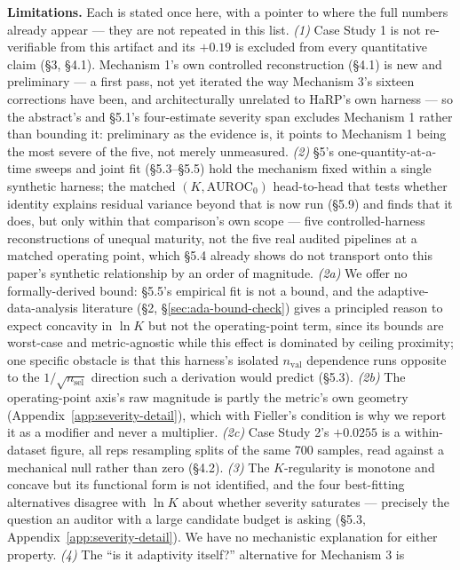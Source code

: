 \documentclass[10pt]{article} %
\begin{document}
\textbf{Limitations.} Each is stated once here, with a pointer to where the
full numbers already appear --- they are not repeated in this list.
\emph{(1)} Case Study 1 is not re-verifiable from this artifact and its
$+0.19$ is excluded from every quantitative claim (§3, §4.1). Mechanism 1's
own controlled reconstruction (§4.1) is new and preliminary --- a first pass,
not yet iterated the way Mechanism 3's sixteen corrections have been, and
architecturally unrelated to HaRP's own harness --- so the abstract's and
§5.1's four-estimate severity span excludes Mechanism 1 rather than bounding
it: preliminary as the evidence is, it points to Mechanism 1 being the most
severe of the five, not merely unmeasured.
\emph{(2)} §5's one-quantity-at-a-time sweeps and joint fit (§5.3--§5.5) hold
the mechanism fixed within a single synthetic harness; the matched
$(K,\text{AUROC}_0)$ head-to-head that tests whether identity explains
residual variance beyond that is now run (§5.9) and finds that it does, but
only within that comparison's own scope --- five controlled-harness
reconstructions of unequal maturity, not the five real audited pipelines at a
matched operating point, which §5.4 already shows do not transport onto this
paper's synthetic relationship by an order of magnitude.
\emph{(2a)} We offer no formally-derived bound: §5.5's empirical fit is not a
bound, and the adaptive-data-analysis literature (§2, §\ref{sec:ada-bound-check})
gives a principled reason to expect concavity in $\ln K$ but not the
operating-point term, since its bounds are worst-case and metric-agnostic
while this effect is dominated by ceiling proximity; one specific obstacle is
that this harness's isolated $n_{\text{val}}$ dependence runs opposite to the
$1/\sqrt{n_{\text{sel}}}$ direction such a derivation would predict (§5.3).
\emph{(2b)} The operating-point axis's raw magnitude is partly the metric's
own geometry (Appendix~\ref{app:severity-detail}), which with Fieller's
condition is why we report it as a modifier and never a multiplier.
\emph{(2c)} Case Study 2's $+0.0255$ is a within-dataset figure, all reps
resampling splits of the same 700 samples, read against a mechanical null
rather than zero (§4.2).
\emph{(3)} The $K$-regularity is monotone and concave but its functional form
is not identified, and the four best-fitting alternatives disagree with
$\ln K$ about whether severity saturates --- precisely the question an
auditor with a large candidate budget is asking (§5.3, Appendix~\ref{app:severity-detail}).
We have no mechanistic explanation for either property.
\emph{(4)} The ``is it adaptivity itself?'' alternative for Mechanism 3 is
\end{document}
